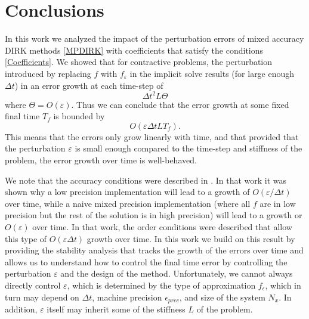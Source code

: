 \documentclass{siamart251104}
\newcommand{\dt}{\Delta t}
\begin{document}
 


\section{Conclusions} \label{sec:conclusions}

In this work we analyzed the impact of the perturbation errors  
of mixed accuracy DIRK methods \eqref{MPDIRK}
with coefficients that satisfy the conditions \eqref{Coefficients}.
We showed that for contractive problems, the perturbation introduced 
by replacing $f$ with $f_\varepsilon$ in the implicit solve results 
(for large enough $\dt$) in  an error growth at each time-step of
\[ \dt^2 L \Theta \]
where $\Theta = O(\varepsilon)$.
Thus we can conclude that the error growth at some fixed final time $T_f$
is bounded by  
\[ O(\varepsilon \dt L  T_f) .\]
This means that the errors only grow linearly with time, and that provided that 
the perturbation $ \varepsilon $ is small enough compared to the 
time-step and stiffness of the problem, the error growth over time is well-behaved.

We note that the accuracy conditions were described in \cite{Grant2022}. In that work it was shown
why a  low precision implementation will lead to a growth of $O(\varepsilon/\dt)$ over time,
while a naive mixed precision implementation (where all $f$ are in low precision but the rest 
of the solution is in high precision) will lead to a growth or  $O(\varepsilon)$ over time.
In that work, the order conditions were described that allow this type of $O(\varepsilon \dt)$ 
growth over time. In this work we build on this result by providing the stability 
analysis that tracks the growth of the errors over time 
and allows us to understand how to control the final time error
by controlling the perturbation $\varepsilon$ and the design of the method.
Unfortunately, we cannot always directly control  $\varepsilon$, which is determined by 
the type of approximation $f_\epsilon$, which in turn may depend on $\dt$,  machine precision 
$\epsilon_{prec}$, and size of the  system $N_x$.  In addition, $\varepsilon$ itself 
may inherit some of the stiffness $L$ of the problem. 
\end{document}

